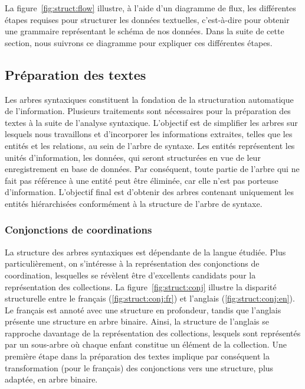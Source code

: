 La figure~\ref{fig:struct:flow} illustre, à l'aide d'un diagramme de flux, les différentes étapes requises pour structurer les données textuelles, c'est-à-dire pour obtenir une grammaire représentant le schéma de nos données.
Dans la suite de cette section, nous suivrons ce diagramme pour expliquer ces différentes étapes.

\subsection{Préparation des textes}

Les arbres syntaxiques constituent la fondation de la structuration automatique de l'information.
Plusieurs traitements sont nécessaires pour la préparation des textes à la suite de l'analyse syntaxique.
L'objectif est de simplifier les arbres sur lesquels nous travaillons et d'incorporer les informations extraites, telles que les entités et les relations, au sein de l'arbre de syntaxe.
Les entités représentent les unités d'information, les données, qui seront structurées en vue de leur enregistrement en base de données.
Par conséquent, toute partie de l'arbre qui ne fait pas référence à une entité peut être éliminée, car elle n'est pas porteuse d'information.
L'objectif final est d'obtenir des arbres contenant uniquement les entités hiérarchisées conformément à la structure de l'arbre de syntaxe.

\subsubsection{Conjonctions de coordinations}

La structure des arbres syntaxiques est dépendante de la langue étudiée.
Plus particulièrement, on s'intéresse à la représentation des conjonctions de coordination, lesquelles se révèlent être d'excellents candidats pour la représentation des collections.
La figure~\ref{fig:struct:conj} illustre la disparité structurelle entre le français (\ref{fig:struct:conj:fr}) et l'anglais (\ref{fig:struct:conj:en}).
Le français est annoté avec une structure en profondeur, tandis que l'anglais présente une structure en arbre binaire.
Ainsi, la structure de l'anglais se rapproche davantage de la représentation des collections, lesquels sont représentés par un sous-arbre où chaque enfant constitue un élément de la collection.
Une première étape dans la préparation des textes implique par conséquent la transformation (pour le français) des conjonctions vers une structure, plus adaptée, en arbre binaire.

